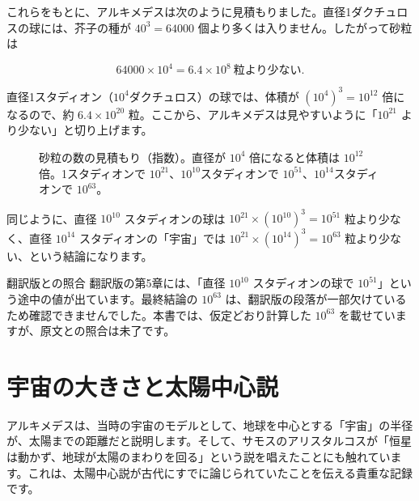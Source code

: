 \documentclass[a4paper,11pt,openany]{ltjsbook}
\begin{document}
これらをもとに、アルキメデスは次のように見積もりました。直径1ダクチュロスの球には、芥子の種が $40^3=64000$ 個より多くは入りません。したがって砂粒は

\[
64000\times10^4 = 6.4\times10^8 \ \text{粒より少ない}.
\]

直径1スタディオン（$10^4$ダクチュロス）の球では、体積が $(10^4)^3=10^{12}$ 倍になるので、約 $6.4\times10^{20}$ 粒。ここから、アルキメデスは見やすいように「$10^{21}$ より少ない」と切り上げます。

\begin{figure}[htbp]
\centering
{}
\caption{砂粒の数の見積もり（指数）。直径が $10^4$ 倍になると体積は $10^{12}$ 倍。1スタディオンで $10^{21}$、$10^{10}$スタディオンで $10^{51}$、$10^{14}$スタディオンで $10^{63}$。}
\end{figure}

同じように、直径 $10^{10}$ スタディオンの球は $10^{21}\times(10^{10})^3=10^{51}$ 粒より少なく、直径 $10^{14}$ スタディオンの「宇宙」では $10^{21}\times(10^{14})^3=10^{63}$ 粒より少ない、という結論になります。

\begin{notebox}{翻訳版との照合}
翻訳版の第5章には、「直径 $10^{10}$ スタディオンの球で $10^{51}$」という途中の値が出ています。最終結論の $10^{63}$ は、翻訳版の段落が一部欠けているため確認できませんでした。本書では、仮定どおり計算した $10^{63}$ を載せていますが、原文との照合は未了です。
\end{notebox}

\section{宇宙の大きさと太陽中心説}

アルキメデスは、当時の宇宙のモデルとして、地球を中心とする「宇宙」の半径が、太陽までの距離だと説明します。そして、サモスのアリスタルコスが「恒星は動かず、地球が太陽のまわりを回る」という説を唱えたことにも触れています。これは、太陽中心説が古代にすでに論じられていたことを伝える貴重な記録です。
\end{document}
